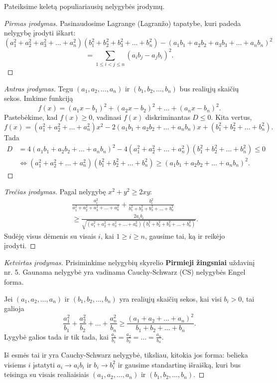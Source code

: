 Pateiksime keletą populiariausių nelygybės įrodymų.

\begin{proof}[Pirmas įrodymas]
  Pasinaudosime Lagrange (Lagranžo) tapatybe, kuri padeda nelygybę įrodyti
  iškart:
  $$(a_1^2+a_2^2+a_3^2+\ldots+a_n^2)(b_1^2+b_2^2+b_3^2+\ldots+b_n^2)-(a_1b_1+a_2b_2+a_3b_3+\ldots+a_nb_n)^2$$
  $$=\sum_{1\leq i< j\leq n}{(a_ib_j-a_jb_i)^2}.$$
\end{proof}

\begin{proof}[Antras įrodymas]
  Tegu $(a_1,a_2,\ldots,a_n)$ ir $(b_1,b_2,\ldots,b_n)$ bus realiųjų
  skaičių sekos. Imkime funkciją
  $$f(x)=(a_1x-b_1)^2+(a_2x-b_2)^2+\ldots+(a_nx-b_n)^2.$$
  Pastebėkime, kad $f(x)\geq0$, vadinasi $f(x)$ diskriminantas $D\leq0$. Kita
  vertus,
  $$f(x)=(a_1^2+a_2^2+\ldots+a_n^2)x^2-2(a_1b_1+a_2b_2+\ldots+a_nb_n)x+(b_1^2+b_2^2+\ldots+b_n^2).$$
  Tada
  \begin{align*}
    D&=4(a_1b_1+a_2b_2+\ldots+a_nb_n)^2-4(a_1^2+a_2^2+\ldots+a_n^2)(b_1^2+b_2^2+\ldots+b_n^2)\leq0\\
    &\Leftrightarrow(a_1^2+a_2^2+\ldots+a_n^2)(b_1^2+b_2^2+\ldots+b_n^2)\geq(a_1b_1+a_2b_2+\ldots+a_nb_n)^2.
  \end{align*}
\end{proof}

\begin{proof}[Trečias įrodymas]
  Pagal nelygybę $x^2+y^2\geq2xy$:
  \begin{eqnarray*}&&\frac{a_i^2}{a_1^2+a_2^2+a_3^2+\ldots+a_n^2}+\frac{b_i^2}{b_1^2+b_2^2+b_3^2+\ldots+b_n^2}\\
    &&\geq\frac{2a_ib_i}{\sqrt{(a_1^2+a_2^2+a_3^2+\ldots+a_n^2)(b_1^2+b_2^2+b_3^2+\ldots+b_n^2)}}.
  \end{eqnarray*}
  Sudėję visus dėmenis su visais $i$, kai $1\geq i \geq n$, gausime tai,
  ką ir reikėjo įrodyti.
\end{proof}

\begin{proof}[Ketvirtas įrodymas]
  Prisiminkime nelygybių skyrelio \textbf{Pirmieji žingsniai} uždavinį nr. 5.
  Gaunama nelygybė yra vadinama Cauchy-Schwarz (CS) nelygybės Engel forma.

  \begin{thm}
    Jei $(a_1,a_2,\ldots,a_n)$ ir $(b_1,b_2,\ldots,b_n)$ yra realiųjų skaičių sekos, kai visi $b_i>0$, tai galioja
$$\frac{a_1^2}{b_1}+\frac{a_2^2}{b_2}+\ldots+\frac{a_n^2}{b_n}\geq\frac{(a_1+a_2+\ldots+a_n)^2}{b_1+b_2+\ldots+b_n}.$$
    Lygybė galios tada ir tik tada, kai $\frac{a_1}{b_1}=\frac{a_2}{b_2}=\ldots=\frac{a_n}{b_n}.$
  \end{thm}

  Iš esmės tai ir yra Cauchy-Schwarz nelygybė, tiksliau, kitokia jos forma:
  belieka visiems $i$ įstatyti $a_i\rightarrow a_ib_i$ ir $b_i\rightarrow
  b_i^2$ ir gausime standartinę išraišką, kuri bus teisinga su visais
  realiaisiais $(a_1,a_2,\ldots,a_n)$ ir $(b_1,b_2,\ldots,b_n)$.
\end{proof}

